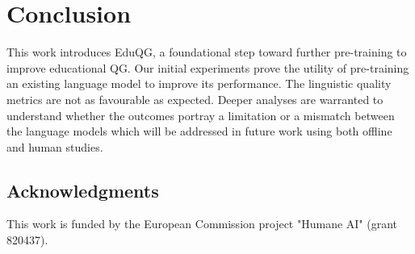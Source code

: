 \documentclass[letterpaper]{article} %
\begin{document}
\section{Conclusion}
This work introduces EduQG, a foundational step toward further pre-training to improve educational QG. Our initial experiments prove the utility of pre-training an existing language model to improve its performance. The linguistic quality metrics are not as favourable as expected. Deeper analyses are warranted to understand whether the outcomes portray a limitation or a mismatch between the language models which will be addressed in future work using both offline and human studies. 

\subsection{Acknowledgments}
This work is funded by the European Commission project "Humane AI" (grant 820437).


\end{document}
